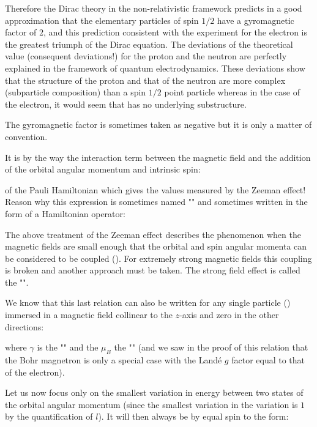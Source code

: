 	Therefore the Dirac theory in the non-relativistic framework predicts in a good approximation that the elementary particles of spin $1/2$ have a gyromagnetic factor of $2$, and this prediction consistent with the experiment for the electron is the greatest triumph of the Dirac equation. The deviations of the theoretical value (consequent deviations!) for the proton and the neutron are perfectly explained in the framework of quantum electrodynamics. These deviations show that the structure of the proton and that of the neutron are more complex (subparticle composition) than a spin $1/2$ point particle whereas in the case of the electron, it would seem that has no underlying substructure.
	\begin{tcolorbox}[title=Remark,colframe=black,arc=10pt]
	The gyromagnetic factor is sometimes taken as negative but it is only a matter of convention.
	\end{tcolorbox}
	It is by the way the interaction term between the magnetic field and the addition of the orbital angular momentum and intrinsic spin:
	
	of the Pauli Hamiltonian which gives the values measured by the Zeeman effect! Reason why this expression is sometimes named "" and sometimes written in the form of a Hamiltonian operator:
	
	\begin{tcolorbox}[title=Remark,colframe=black,arc=10pt]
	The above treatment of the Zeeman effect describes the phenomenon when the magnetic fields are small enough that the orbital and spin angular momenta can be considered to be coupled (). For extremely strong magnetic fields this coupling is broken and another approach must be taken. The strong field effect is called the "".
	\end{tcolorbox}
	We know that this last relation can also be written for any single particle () immersed in a magnetic field collinear to the $z$-axis and zero in the other directions:
	
	where $\gamma$ is the "" and the $\mu_B$ the "" (and we saw in the proof of this relation that the Bohr magnetron is only a special case with the Landé $g$ factor equal to that of the electron).
	
	Let us now focus only on the smallest variation in energy between two states of the orbital angular momentum (since the smallest variation in the variation is $1$ by the quantification of $l$). It will then always be by equal spin to the form:
	
